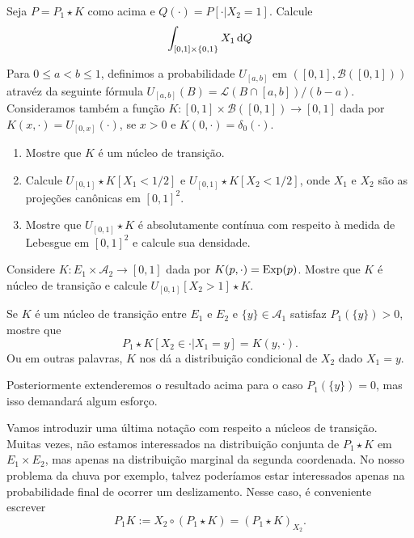 \begin{exercise}
  Seja $P = P_1 \star K$ como acima e $Q(\cdot) = P[\cdot | X_2 = 1]$.
  Calcule
  \begin{equation}
    \int_{[0,1] \times \{0,1\}} X_1 \mathop{}\!\mathrm{d} Q
  \end{equation}
\end{exercise}

\begin{exercise}
  Para $0 \leq a < b \leq 1$, definimos a probabilidade $U_{[a,b]}$ em $([0,1], \mathcal{B}([0,1]))$ atravéz da seguinte fórmula $U_{[a,b]}(B) = \mathcal{L}(B \cap [a,b])/(b-a)$.
  Consideramos também a função $K:[0,1] \times \mathcal{B}([0,1]) \to [0,1]$ dada por $K(x, \cdot) = U_{[0,x]} (\cdot)$, se $x > 0$ e $K(0, \cdot) = \delta_0(\cdot)$.
  \begin{enumerate}[\quad a)]
  \item Mostre que $K$ é um núcleo de transição.
  \item Calcule $U_{[0,1]} \star K [X_1 < 1/2]$ e $U_{[0,1]} \star K [X_2 < 1/2]$, onde $X_1$ e $X_2$ são as projeções canônicas em $[0,1]^2$.
  \item Mostre que $U_{[0,1]} \star K$ é absolutamente contínua com respeito à medida de Lebesgue em $[0,1]^2$ e calcule sua densidade.
\end{enumerate}

\end{exercise}

\begin{exercise}
  Considere $K:E_1 \times \mathcal{A}_2 \to [0,1]$ dada por $K(p, \cdot) = \operatorname{Exp}(p)$.
  Mostre que $K$ é núcleo de transição e calcule $U_{[0,1]}[X_2 > 1] \star K$.
\end{exercise}

\begin{exercise}
  Se $K$ é um núcleo de transição entre $E_1$ e $E_2$ e $\{y\} \in \mathcal{A}_1$ satisfaz $P_1(\{y\}) > 0$, mostre que
  \begin{equation}
    P_1 \star K [X_2 \in \cdot | X_1 = y] = K(y, \cdot).
  \end{equation}
  Ou em outras palavras, $K$ nos dá a distribuição condicional de $X_2$ dado $X_1 = y$.
\end{exercise}

Posteriormente extenderemos o resultado acima para o caso $P_1(\{y\}) = 0$, mas isso demandará algum esforço.

Vamos introduzir uma última notação com respeito a núcleos de transição.
Muitas vezes, não estamos interessados na distribuição conjunta de $P_1 \star K$ em $E_1 \times E_2$, mas apenas na distribuição marginal da segunda coordenada.
No nosso problema da chuva por exemplo, talvez poderíamos estar interessados apenas na probabilidade final de ocorrer um deslizamento.
Nesse caso, é conveniente escrever
\begin{equation}
  \label{e:P1_K}
  P_1 K := X_2 \circ (P_1 \star K) = (P_1 \star K)_{X_2}.
\end{equation}

